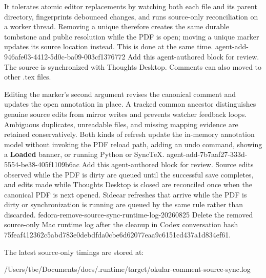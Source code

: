 It tolerates atomic editor replacements by watching both each file and its parent directory, fingerprints debounced changes, and runs source-only reconciliation on a worker thread.
Removing a unique  therefore creates the same durable tombstone and public resolution while the PDF is open; moving a unique marker updates its source location instead.
This is done at the same time.
\agentProposedEdit
  {agent-add-946afe03-4412-5d0c-ba09-003cf1376772}
  {Add this agent-authored block for review.}
  {}
  {The  source is synchronized with Thoughts Desktop.}
Comments can also moved to other .tex files.

Editing the marker's second argument revises the canonical comment and updates the open annotation in place.  
A tracked common ancestor distinguishes genuine source edits from mirror writes and prevents watcher feedback loops.
Ambiguous duplicates, unreadable files, and missing mapping evidence are retained conservatively.
Both kinds of refresh update the in-memory annotation model without invoking the PDF reload path, adding an undo command, showing a \textbf{Loaded} banner, or running Python or SyncTeX.
\agentProposedEdit
  {agent-add-7b7aaf27-333d-5554-be38-405f1109b6ac}
  {Add this agent-authored block for review.}
  {}
  {Source edits observed while the PDF is dirty are queued until the successful save completes, and edits made while Thoughts Desktop is closed are reconciled once when the canonical PDF is next opened.}
Sidecar refreshes that arrive while the PDF is dirty or synchronization is running are queued by the same rule rather than discarded.
\agentProposedEdit
  {fedora-remove-source-sync-runtime-log-20260825}
  {Delete the removed source-only Mac runtime log after the cleanup in Codex conversation hash 75feaf412362c5abd783e0debdfda0cbe6d62077eaa9c6151cd437a1d834ef61.}
  {The latest source-only timings are stored at:
\begin{DocCode}
/Users/tbe/Documents/docs/.runtime/target/okular-comment-source-sync.log
\end{DocCode}}
  {}
\agentProposedEdit
